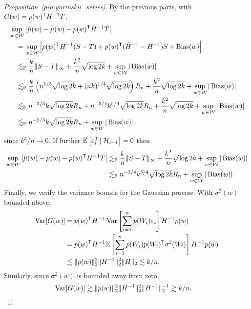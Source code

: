 \begin{proof}[Proposition~\ref{pro:yurinskii_series}]

  By the previous parts,
  with $G(w) = p(w)^{\mathsf{T}} H^{-1} T$,
  \begin{align*}
    &\sup_{w \in \mathcal{W}}
    \left|
    \hat\mu(w) - \mu(w)
    - p(w)^{\mathsf{T}} H^{-1} T
    \right| \\
    &\quad=
    \sup_{w \in \mathcal{W}}
    \left|
    p(w)^{\mathsf{T}} H^{-1} (S - T)
    + p(w)^{\mathsf{T}} (\hat H^{-1} - H^{-1}) S
    + \operatorname{Bias}(w)
    \right| \\
    &\quad\lesssim_{\mathbb{P}}
    \frac{k}{n}
    \|S - T\|_\infty
    + \frac{k^2}{n} \sqrt{\log 2k}
    + \sup_{w \in \mathcal{W}} |\operatorname{Bias}(w)| \\
    &\quad\lesssim_{\mathbb{P}}
    \frac{k}{n}
    \left( n^{1/3} \sqrt{\log 2k} + (n k)^{1/4} \sqrt{\log 2k} \right) R_n
    + \frac{k^2}{n} \sqrt{\log 2k}
    + \sup_{w \in \mathcal{W}} |\operatorname{Bias}(w)| \\
    &\quad\lesssim_{\mathbb{P}}
    n^{-2/3} k \sqrt{\log 2k} R_n
    + n^{-3/4} k^{5/4} \sqrt{\log 2k} R_n
    + \frac{k^2}{n} \sqrt{\log 2k}
    + \sup_{w \in \mathcal{W}} |\operatorname{Bias}(w)| \\
    &\quad\lesssim_{\mathbb{P}}
    n^{-2/3} k \sqrt{\log 2k} R_n
    + \sup_{w \in \mathcal{W}} |\operatorname{Bias}(w)|
  \end{align*}
  since $k^3/n \to 0$.
  If further $\mathbb{E} \left[ \varepsilon_i^3 \mid \mathcal{H}_{i-1} \right] = 0$ then
  \begin{align*}
    \sup_{w \in \mathcal{W}}
    \left|
    \hat\mu(w) - \mu(w)
    - p(w)^{\mathsf{T}} H^{-1} T
    \right|
    &\lesssim_{\mathbb{P}}
    \frac{k}{n}
    \|S - T\|_\infty
    + \frac{k^2}{n} \sqrt{\log 2k}
    + \sup_{w \in \mathcal{W}} |\operatorname{Bias}(w)| \\
    &\lesssim_{\mathbb{P}}
    n^{-3/4} k^{5/4} \sqrt{\log 2k} R_n
    + \sup_{w \in \mathcal{W}} |\operatorname{Bias}(w)|.
  \end{align*}
  Finally, we verify the variance bounds for the Gaussian process.
  With $\sigma^2(w)$ bounded above,
  \begin{align*}
    \operatorname{Var}[G(w)]
    &=
    p(w)^{\mathsf{T}} H^{-1}
    \operatorname{Var}\left[ \sum_{i=1}^n p(W_i) \varepsilon_i \right]
    H^{-1} p(w) \\
    &=
    p(w)^{\mathsf{T}} H^{-1}
    \mathbb{E}\left[\sum_{i=1}^n p(W_i) p(W_i)^{\mathsf{T}} \sigma^2(W_i) \right]
    H^{-1} p(w) \\
    &\lesssim
    \|p(w)\|_2^2 \|H^{-1}\|_2^2
    \|H\|_2
    \lesssim
    k/n.
  \end{align*}
  Similarly, since $\sigma^2(w)$ is bounded away from zero,
  \begin{align*}
    \operatorname{Var}[G(w)]
    &\gtrsim
    \|p(w)\|_2^2 \|H^{-1}\|_2^2
    \|H^{-1}\|_2^{-1}
    \gtrsim
    k/n.
  \end{align*}


\end{proof}
